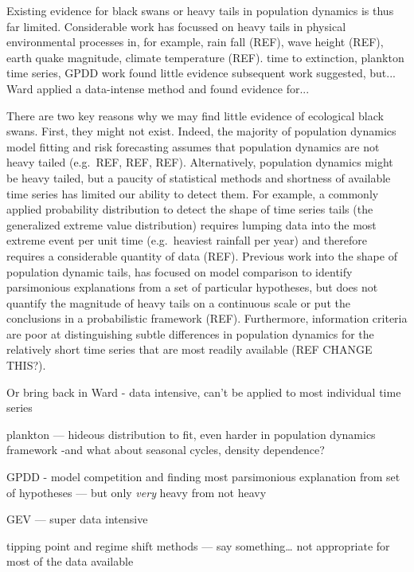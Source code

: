 Existing evidence for black swans or heavy tails in population dynamics is thus
far limited. Considerable work has focussed on heavy tails in physical
environmental processes in, for example, rain fall (REF), wave height (REF),
earth quake magnitude, climate temperature (REF). time to extinction, plankton
time series, GPDD work found little evidence subsequent work suggested, but...
Ward applied a data-intense method and found evidence for...

There are two key reasons why we may find little evidence of ecological black
swans. First, they might not exist. Indeed, the majority of population
dynamics model fitting and risk forecasting assumes that population dynamics
are not heavy tailed (e.g.~REF, REF, REF). Alternatively, population dynamics
might be heavy tailed, but a paucity of statistical methods and shortness of
available time series has limited our ability to detect them. For example,
a commonly applied probability distribution to detect the shape of time series
tails (the generalized extreme value distribution) requires lumping data into
the most extreme event per unit time (e.g.~heaviest rainfall per year) and
therefore requires a considerable quantity of data (REF). Previous work into
the shape of population dynamic tails, has focused on model comparison to
identify parsimonious explanations from a set of particular hypotheses, but
does not quantify the magnitude of heavy tails on a continuous scale or put the
conclusions in a probabilistic framework (REF). Furthermore, information
criteria are poor at distinguishing subtle differences in population dynamics
for the relatively short time series that are most readily available (REF CHANGE
THIS?).

Or bring back in Ward - data intensive, can't be applied to most individual
time series

plankton --- hideous distribution to fit, even harder in population dynamics
framework -and what about seasonal cycles, density dependence?

GPDD - model competition and finding most parsimonious explanation from set of
hypotheses --- but only \emph{very} heavy from not heavy

GEV --- super data intensive

tipping point and regime shift methods --- say something\ldots{} not
appropriate for most of the data available

